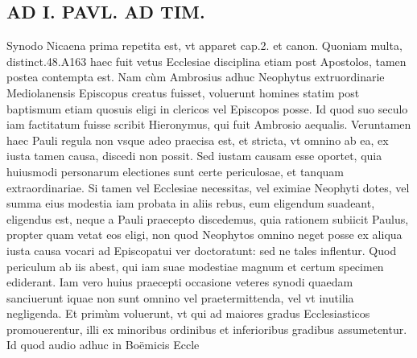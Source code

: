 \documentclass{article}
\begin{document}
\begin{pages}
\section*{AD I. PAVL. AD TIM. }
\marginpar{[ p.146 ]}\pstart Synodo Nicaena prima repetita est, vt apparet cap.2. et canon. Quoniam multa, distinct.48.A163 haec fuit vetus Ecclesiae disciplina etiam post Apostolos, tamen postea contempta est. Nam cùm Ambrosius adhuc Neophytus extruordinarie Mediolanensis Episcopus creatus fuisset, voluerunt homines statim post baptismum etiam quosuis eligi in clericos vel Episcopos posse. Id quod suo seculo iam factitatum fuisse scribit Hieronymus, qui fuit Ambrosio aequalis.  \pend\pstart Veruntamen haec Pauli regula non vsque adeo praecisa est, et stricta, vt omnino ab ea, ex iusta tamen causa, discedi non possit. Sed iustam causam esse oportet, quia huiusmodi personarum electiones sunt certe periculosae, et tanquam extraordinariae. Si tamen vel Ecclesiae necessitas, vel eximiae Neophyti dotes, vel summa eius modestia iam probata in aliis rebus, eum eligendum suadeant, eligendus est, neque a Pauli praecepto discedemus, quia rationem subiicit Paulus, propter quam vetat eos eligi, non quod Neophytos omnino neget posse ex aliqua iusta causa vocari ad Episcopatui ver doctoratunt: sed ne tales inflentur. Quod periculum ab iis abest, qui iam suae modestiae magnum et certum specimen ediderant.  \pend\pstart Iam vero huius praecepti occasione veteres synodi quaedam sanciuerunt iquae non sunt omnino vel praetermittenda, vel vt inutilia negligenda.  \pend\pstart Et primùm voluerunt, vt qui ad maiores gradus Ecclesiasticos promouerentur, illi ex minoribus ordinibus et inferioribus gradibus assumetentur. Id quod audio adhuc in Boëmicis Eccle\pend

\end{pages}
\end{document}
